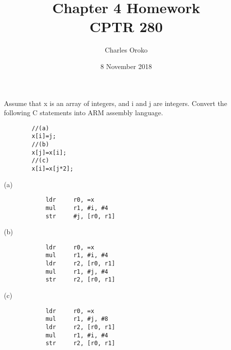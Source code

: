 \documentclass[12pt]{article}
\newenvironment{exercise}[2][Exercise]{\begin{trivlist}
\item[\hskip \labelsep {\bfseries #1}\hskip \labelsep {\bfseries #2.}]}{\end{trivlist}}
\newenvironment{solution}[2][Solution]{\begin{trivlist}
\item[\hskip \labelsep {\bfseries #1}]}{\end{trivlist}}
\begin{document}
 
 
\title{Chapter 4 Homework\\CPTR 280}%
\author{Charles Oroko} %
\date{8 November 2018}
\maketitle


\begin{exercise}{3.10}
    Assume that x is an array of integers, and i and j are integers. Convert the following C statements into ARM assembly language.
    \begin{verbatim}
        //(a)
        x[i]=j;
        //(b)
        x[j]=x[i];
        //(c)
        x[i]=x[j*2];
    \end{verbatim}

    \begin{solution}((a)
        \begin{verbatim}
            ldr     r0, =x
            mul     r1, #i, #4
            str     #j, [r0, r1]
        \end{verbatim}
    \end{solution}
    \begin{solution}((b)
        \begin{verbatim}
            ldr     r0, =x
            mul     r1, #i, #4
            ldr     r2, [r0, r1]
            mul     r1, #j, #4
            str     r2, [r0, r1]
        \end{verbatim}
    \end{solution}
    \begin{solution}((c)
        \begin{verbatim}
            ldr     r0, =x
            mul     r1, #j, #8
            ldr     r2, [r0, r1]
            mul     r1, #i, #4
            str     r2, [r0, r1]
        \end{verbatim}
    \end{solution}
\end{exercise}
\end{document}
